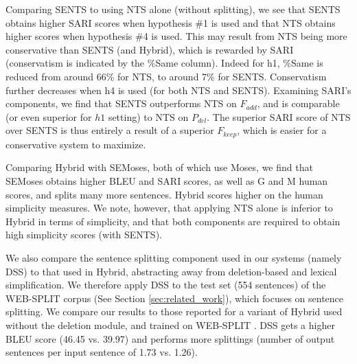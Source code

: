 \documentclass[11pt,a4paper]{article}
\begin{document}
Comparing SENTS to using NTS alone (without splitting), 
we see that SENTS obtains higher SARI scores when hypothesis \#1 is used and that NTS obtains 
higher scores when hypothesis \#4 is used.
This may result from NTS being more conservative than SENTS (and {\sc Hybrid}), which is rewarded by SARI
(conservatism is indicated by the $\%$Same column). Indeed for h1, \%Same is reduced 
from around 66$\%$ for NTS, to around 7$\%$ for SENTS. 
Conservatism further decreases when h4 is used (for both NTS and SENTS).
Examining SARI's components, we find that SENTS outperforms NTS on $F_{add}$,
and is comparable (or even superior for $h1$ setting) to NTS on $P_{del}$. The superior SARI
score of NTS over SENTS is thus entirely a result of a superior $F_{keep}$, which is easier for a conservative system to maximize. 

Comparing {\sc Hybrid} with SEMoses, both of which use Moses, 
we find that SEMoses obtains higher BLEU and SARI scores, as well as G and M human scores, and splits many more sentences.
{\sc Hybrid} scores higher on the human simplicity measures. We note, however, that applying NTS alone is inferior to {\sc Hybrid}
in terms of simplicity, and that both components are required to obtain high simplicity scores (with SENTS).

We also compare the sentence splitting component used in our systems (namely DSS) to that used in {\sc Hybrid}, abstracting away from deletion-based and lexical simplification. We therefore apply DSS to the test set (554 sentences) of the WEB-SPLIT corpus \citep{N17} (See Section \ref{sec:related_work}), which focuses on sentence splitting. We compare our results to those reported for a variant of {\sc Hybrid} used without the deletion module, and trained on WEB-SPLIT \citep{N17}. DSS gets a higher BLEU score (46.45 vs. 39.97) and performs more splittings (number of output sentences per input sentence of 1.73 vs. 1.26).
\end{document}
